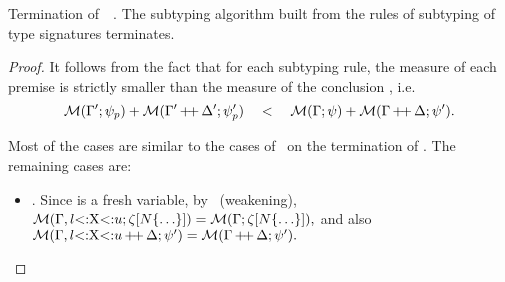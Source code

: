 \begin{theorem}{Termination of\ \ .}%
\label{thm:subtysig-terminates}
    The subtyping algorithm built from the rules of
    subtyping of type signatures
     terminates.
\end{theorem}
\begin{proof}
    It follows from the fact that for each subtyping rule, 
    the measure of each premise 
    is strictly smaller than the measure 
    of the conclusion , i.e.
    \[\operatorname{\mathcal{M}}(\Gamma';\psi_p) + \operatorname{\mathcal{M}}(\Gamma'\operatorname{+\!+}\Delta';\psi'_p) \quad<\quad 
    \operatorname{\mathcal{M}}(\Gamma;\psi) + \operatorname{\mathcal{M}}(\Gamma\operatorname{+\!+}\Delta;\psi').\]

    Most of the cases are similar to the cases of~
    on the termination of .
    The remaining cases are:
    \begin{itemize}
        \item {}. Since \vx is a fresh variable,
            by~ (weakening),
            $\operatorname{\mathcal{M}}(\Gamma, l{\operatorname{<:}}\mathrm{X}{\operatorname{<:}}u;\zeta[N\{\ldots\}]) = 
            \operatorname{\mathcal{M}}(\Gamma;\zeta[N\{\ldots\}]),$ and also
            $\operatorname{\mathcal{M}}(\Gamma, l{\operatorname{<:}}\mathrm{X}{\operatorname{<:}}u\operatorname{+\!+}\Delta;\psi')
            = \operatorname{\mathcal{M}}(\Gamma\operatorname{+\!+}\Delta;\psi').$


\end{itemize}
\end{proof}
